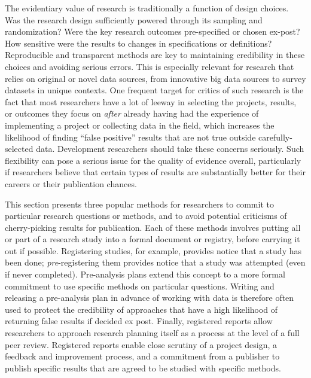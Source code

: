 The evidentiary value of research is traditionally a function of design choices.\cite{angrist2010credibility,ioannidis2005most}
Was the research design sufficiently powered through its sampling and randomization?
Were the key research outcomes pre-specified or chosen ex-post?
How sensitive were the results to changes in specifications or definitions?
Reproducible and transparent methods are key to maintaining credibility
in these choices and avoiding serious errors.\cite{christensen2019transparent}
This is especially relevant for research that relies on original or novel data sources,
from innovative big data sources to survey datasets in unique contexts.
One frequent target for critics of such research\cite{ioannidis2017power}
is the fact that most researchers have a lot of leeway
in selecting the projects, results, or outcomes they focus on
\textit{after} already having had the experience of implementing a project
or collecting data in the field,
which increases the likelihood of finding ``false positive''
results that are not true outside carefully-selected data.
Development researchers should take these concerns seriously.
Such flexibility can pose a serious issue for the quality of evidence overall,
particularly if researchers believe that certain types of results
are substantially better for their careers or their publication chances.

This section presents three popular methods
for researchers to commit to particular research questions or methods,
and to avoid potential criticisms of cherry-picking results for publication.
Each of these methods involves putting all or part of a research study
into a formal document or registry, before carrying it out if possible.
Registering studies, for example, provides notice that a study has been done;
\textit{pre}-registering them provides notice that a study was attempted (even if never completed).
Pre-analysis plans extend this concept to a more formal commitment
to use specific methods on particular questions.
Writing and releasing a pre-analysis plan
in advance of working with data is therefore often used to protect the credibility
of approaches that have a high likelihood of returning false results if decided ex post.
Finally, registered reports allow researchers to approach research planning itself
as a process at the level of a full peer review.
Registered reports enable close scrutiny of a project design,
a feedback and improvement process,
and a commitment from a publisher to publish specific results
that are agreed to be studied with specific methods.

